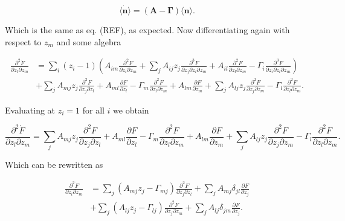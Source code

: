 \begin{equation}
\dot{\langle \mathbf{n}\rangle} = (\mathbf{A}-\mathbf{\Gamma})\langle \mathbf{n}\rangle.
\end{equation}

Which is the same as  eq. (REF), as expected. Now differentiating again with respect to $z_m$ and some algebra

\begin{equation}
\begin{split}
\frac{\partial^2 \dot{F}}{\partial z_l \partial z_m} &= \sum_i(z_i-1) \left(A_{im}\frac{\partial^2F}{\partial z_i \partial z_m} + \sum_jA_{ij}z_j\frac{\partial^3F}{\partial z_j \partial z_l \partial z_m}+A_{il}\frac{\partial^2F}{\partial z_l\partial z_m} - \Gamma_i\frac{\partial^3F}{\partial z_i \partial z_l \partial z_m}   \right)\\
&+\sum_jA_{mj}z_j\frac{\partial^2F}{\partial z_j\partial z_l}+A_{ml}\frac{\partial F}{\partial z_l} - \Gamma_m\frac{\partial^2F}{\partial z_l\partial z_m} + A_{lm}\frac{\partial F}{\partial z_m} + \sum_jA_{lj}z_j\frac{\partial^2F}{\partial z_j\partial z_m}-\Gamma_l\frac{\partial^2F}{\partial z_l\partial z_m}.
\end{split}
\end{equation}

Evaluating at $z_i=1$ for all $i$ we obtain

\begin{equation}
\frac{\partial^2\dot{F}}{\partial z_l \partial z_m} = \sum_jA_{mj}z_j\frac{\partial^2F}{\partial z_j\partial z_l}+A_{ml}\frac{\partial F}{\partial z_l} - \Gamma_m\frac{\partial^2F}{\partial z_l\partial z_m} + A_{lm}\frac{\partial F}{\partial z_m} + \sum_jA_{lj}z_j\frac{\partial^2F}{\partial z_j\partial z_m}-\Gamma_l\frac{\partial^2F}{\partial z_l\partial z_m}.
\end{equation}

Which can be rewritten as

\begin{equation}
  \begin{split}
    \frac{\partial^2\dot{F}}{\partial z_l \partial z_m} &= \sum_j\left(A_{mj}z_j-\Gamma_{mj}\right)\frac{\partial^2F}{\partial z_j\partial z_l} + \sum_jA_{mj}\delta_{jl}\frac{\partial F}{\partial z_j}\\
&+\sum_j\left(A_{lj}z_j-\Gamma_{lj}\right)\frac{\partial^2F}{\partial z_j\partial z_m} + \sum_jA_{lj}\delta_{jm}\frac{\partial F}{\partial z_j}.
  \end{split}
\end{equation}

